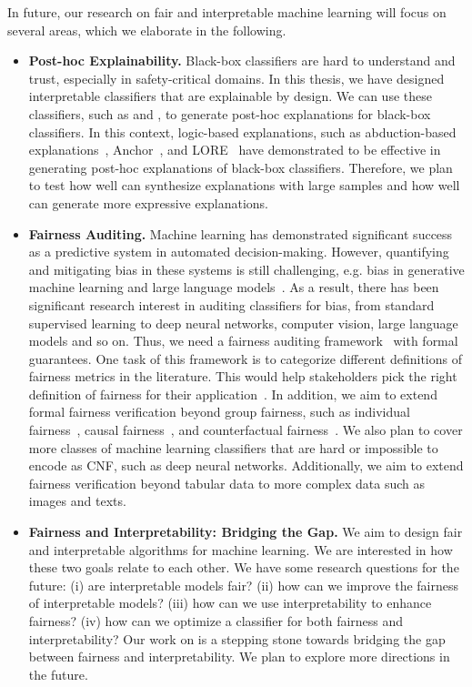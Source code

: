 In future, our research on fair and interpretable machine learning will focus on several areas, which we elaborate in the following.

\begin{itemize}
	\item 
	\textbf{Post-hoc Explainability.} Black-box classifiers are hard to understand and trust, especially in safety-critical domains. In this thesis, we have designed interpretable classifiers that are explainable by design. We can use these classifiers, such as {\imli} and {\crr}, to generate post-hoc explanations for black-box classifiers. In this context, logic-based explanations, such as abduction-based explanations~\cite{ignatiev2019abduction}, Anchor~\cite{ribeiro2018anchors}, and LORE~\cite{guidotti2018local} have demonstrated to be effective in generating post-hoc explanations of black-box classifiers. Therefore, we plan to test how well {\imli} can synthesize explanations with large samples and how well {\crr} can generate more expressive explanations.
	
	
	\item \textbf{Fairness Auditing.} Machine learning has demonstrated significant success as a predictive system in automated decision-making. However, quantifying and mitigating bias in these systems is still challenging, e.g. bias in generative machine learning and large language models~\cite{abid2021persistent,nadeem2020stereoset,vig2020investigating}. As a result, there has been significant research interest in auditing classifiers for bias, from standard supervised learning to deep neural networks, computer vision, large language models and so on. Thus, we need a fairness auditing framework~\cite{ruf2021towards,yan2022active} with formal guarantees. One task of this framework is to categorize different definitions of fairness metrics in the literature. This would help stakeholders pick the right definition of fairness for their application~\cite{ruf2021towards}. In addition, we aim to extend formal fairness verification beyond group fairness, such as individual fairness~\cite{john2020verifying}, causal fairness~\cite{pan2021explaining,zhang2018fairness}, and counterfactual fairness~\cite{wu2019counterfactual,chiappa2019path}. We also plan to cover more classes of machine learning classifiers that are hard or impossible to encode as CNF, such as deep neural networks. Additionally, we aim to extend fairness verification beyond tabular data to more complex data such as images and texts.
	
	
	\item \textbf{Fairness and Interpretability: Bridging the Gap.} We aim to design fair and interpretable algorithms for  machine learning. We are interested in how these two goals relate to each other. We have some research questions for the future: (i) are interpretable models fair? (ii) how can we improve the fairness of interpretable models? (iii) how can we use interpretability to enhance fairness? (iv) how can we optimize a classifier for both fairness and interpretability? Our work on {\fairXplainer} is a stepping stone towards bridging the gap between fairness and interpretability. We plan to explore more directions in the future.
	

\end{itemize}
